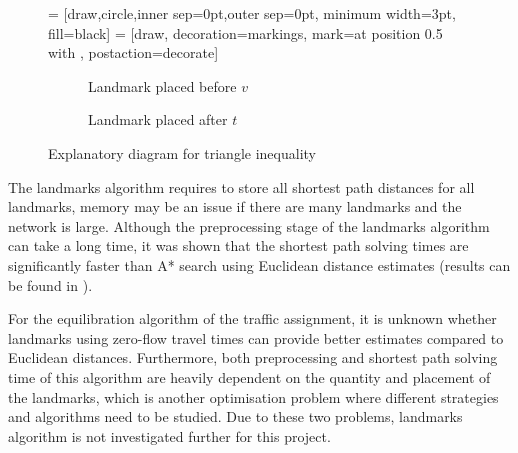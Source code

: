 \begin{figure}[!ht]
    \centering
     = [draw,circle,inner sep=0pt,outer sep=0pt, minimum width=3pt, fill=black]
     = [draw, decoration={markings, mark=at position 0.5 with {\arrow{>}}}, postaction={decorate}]
    \begin{subfigure}[t]{.4\textwidth}
        \centering
        \caption{Landmark placed before $v$}
    \end{subfigure}
    \hspace{1cm}
    \begin{subfigure}[t]{.4\textwidth}
        \centering
        \caption{Landmark placed after $t$}
    \end{subfigure}
    \caption{Explanatory diagram for triangle inequality}
    \label{fig:landmarks}
\end{figure}

The landmarks algorithm requires to store all shortest path distances for all landmarks, memory may be an issue if there are many landmarks and the network is large.
Although the preprocessing stage of the landmarks algorithm can take a long time,
it was shown that the shortest path solving times are significantly faster than A* search using Euclidean distance estimates (results can be found in \citet{GoldbergLandmarks}).

For the equilibration algorithm of the traffic assignment,
it is unknown whether landmarks using zero-flow travel times can provide better estimates compared to Euclidean distances.
Furthermore, both preprocessing and shortest path solving time of this algorithm are heavily dependent on the quantity and placement of the landmarks,
which is another optimisation problem where different strategies and algorithms need to be studied.
Due to these two problems, landmarks algorithm is not investigated further for this project.
